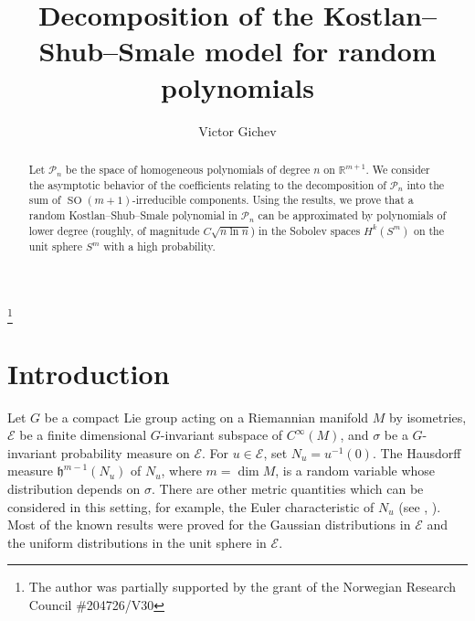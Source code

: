 \documentclass[10pt]{amsart}
\theoremstyle{remark}
\begin{document}
\title{Decomposition of the Kostlan--Shub--Smale model for random polynomials}
\author[V.~Gichev]{Victor Gichev}

\thanks{The author was partially supported by
the grant of the Norwegian Research Council \#204726/V30}


\address{Sobolev Institute of Mathematics\\
Omsk Branch\\
ul. Pevtsova, 13, \\ 644099, Omsk, Russia}

\begin{abstract}
Let ${\mathcal{P}}_n$ be the space of homogeneous polynomials of degree $n$
on ${\mathbb{R}}^{m+1}$. We consider the asymptotic behavior of the
coefficients relating to the decomposition of ${\mathcal{P}}_n$ into the sum
of ${\mathop{\mathrm{SO}}}(m+1)$-irreducible components. Using the results, we prove
that a random Kostlan--Shub--Smale polynomial in ${\mathcal{P}}_n$ can be
approximated by polynomials of lower degree (roughly, of magnitude
$C\sqrt{n\ln n}$) in the Sobolev spaces $H^k(S^m)$ on the unit
sphere $S^m$ with a high probability.
\end{abstract}
\maketitle

\section{Introduction}

Let $G$ be a compact Lie group acting on a Riemannian manifold $M$
by isometries, ${\mathcal{E}}$ be a finite dimensional $G$-invariant
subspace of $C^\infty(M)$, and $\sigma$ be a $G$-invariant
probability measure on ${\mathcal{E}}$. For $u\in{\mathcal{E}}$, set
$N_u=u^{-1}(0)$. The Hausdorff measure ${{\mathord{\mathfrak{h}}}}^{m-1}(N_u)$ of $N_u$,
where $m=\dim M$, is a random variable whose distribution depends
on $\sigma$. There are other metric quantities which can be
considered in this setting, for example, the Euler characteristic
of $N_u$ (see \cite{Po99}, \cite{Bu07}). Most of the known results
were proved for the Gaussian distributions in ${\mathcal{E}}$ and the
uniform distributions in the unit sphere in ${\mathcal{E}}$.
\end{document}
